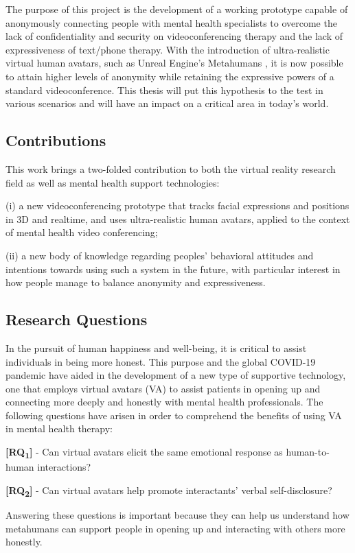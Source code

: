 The purpose of this project is the development of a working prototype capable of anonymously connecting people with mental health specialists to overcome the lack of confidentiality and security on videoconferencing therapy and the lack of expressiveness of text/phone therapy. With the introduction of ultra-realistic virtual human avatars, such as Unreal Engine's Metahumans \cite{EPI21, FAN21}, it is now possible to attain higher levels of anonymity while retaining the expressive powers of a standard videoconference. This thesis will put this hypothesis to the test in various scenarios and will have an impact on a critical area in today's world.

\subsection{Contributions}
This work brings a two-folded contribution to both the virtual reality research field as well as mental health support technologies:

(i) a new videoconferencing prototype that tracks facial expressions and positions in 3D and realtime, and uses ultra-realistic human avatars, applied to the context of mental health video conferencing;

(ii) a new body of knowledge regarding peoples’ behavioral attitudes and intentions towards using such a system in the future, with particular interest in how people manage to balance anonymity and expressiveness.

\subsection{Research Questions}
In the pursuit of human happiness and well-being, it is critical to assist individuals in being more honest. This purpose and the global COVID-19 pandemic have aided in the development of a new type of supportive technology, one that employs virtual avatars (VA) to assist patients in opening up and connecting more deeply and honestly with mental health professionals. The following questions have arisen in order to comprehend the benefits of using VA in mental health therapy:

\textbf{[RQ\textsubscript{1}]} - Can virtual avatars elicit the same emotional response as human-to-human interactions?

\textbf{[RQ\textsubscript{2}]} - Can virtual avatars help promote interactants' verbal self-disclosure?

Answering these questions is important because they can help us understand how metahumans can support people in opening up and interacting with others more honestly. 

